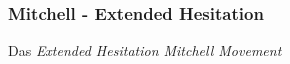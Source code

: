 \subsubsection{Mitchell - Extended Hesitation}

\noindent
Das \textit{Extended Hesitation Mitchell Movement}
